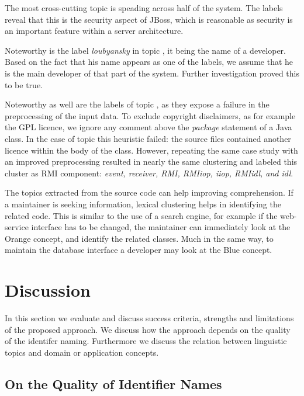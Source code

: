 The most cross-cutting topic is \yellow speading across half of the system. The labels reveal that this is the security aspect of JBoss, which is reasonable as security is an important feature within a server architecture.

Noteworthy is the label \emph{loubyansky} in topic \blue, it being the name of a developer. Based on the fact that his name appears as one of the labels, we assume that he is the main developer of that part of the system. Further investigation proved this to be true.

Noteworthy as well are the labels of topic \darkgreen, as they expose a failure in the preprocessing of the input data. To exclude copyright disclaimers, as for example the GPL licence, we ignore any comment above the \emph{package} statement of a Java class. In the case of topic \darkgreen this heuristic failed: the source files contained another licence within the body of the class. However, repeating the same case study with an improved preprocessing resulted in nearly the same clustering and labeled this cluster as RMI component: \emph{event, receiver, RMI, RMIiop, iiop, RMIidl, and idl}.

The topics extracted from the source code can help improving comprehension. If a maintainer is seeking information, lexical clustering helps in identifying the related code. This is similar to the use of a search engine, for example if the web-service interface has to be changed, the maintainer can immediately look at the Orange concept, and identify the related classes. Much in the same way, to maintain the database interface a developer may look at the Blue concept.


\section{Discussion}\label{sec:discussion}


In this section we evaluate and discuss success criteria, strengths and limitations of the proposed approach. We discuss how the approach depends on the quality of the identifer naming. Furthermore we discuss the relation between linguistic topics and domain or application concepts.

\subsection{On the Quality of Identifier Names}

